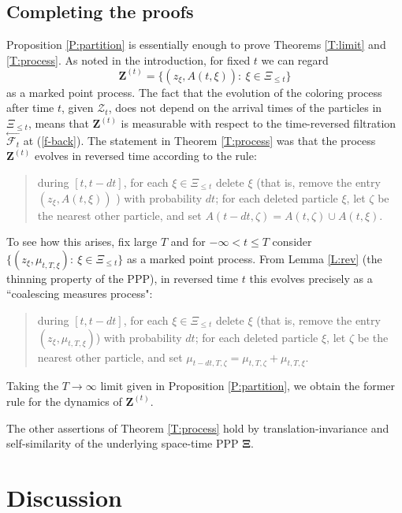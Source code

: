\documentclass[12pt]{article}
\newcommand{\FF}{\mbox{${\mathcal F}$}}
\newcommand{\ZZ}{\mbox{${\mathcal Z}$}}
\newcommand{\bZ}{\mathbf{Z}}
\begin{document}
\subsection{Completing the proofs}
Proposition \ref{P:partition} is essentially enough to prove Theorems \ref{T:limit} and \ref{T:process}.
As noted in the introduction, for fixed $t$ we can regard 
\[ \bZ^{(t)} = 
\{ (z_\xi, A(t,\xi)): \ \xi \in  \Xi_{\le t}  \}
\]
as a marked point process.
The fact that the evolution of the coloring process after time $t$, given $\ZZ_t$, does not depend on the arrival times of the particles in $\Xi_{\le t}$, 
means that $ \bZ^{(t)} $ is measurable with respect to the time-reversed filtration 
$\stackrel{\leftarrow} {\FF_{t}}$ at (\ref{f-back}).  
The statement in Theorem \ref{T:process} was that the process $ \bZ^{(t)} $
evolves in reversed time according to the rule:
\begin{quote}
during $[t, t - dt]$, for each $\xi \in \Xi_{\le t}$  delete $\xi$ 
(that is, remove the entry  $(z_\xi, A(t, \xi))$ )
 with probability $dt$; 
for each deleted particle $\xi$, let $\zeta$ be the nearest other particle,
and set  $A(t - dt, \zeta) = A(t, \zeta) \cup A(t,\xi)$.
\end{quote}
To see how this arises, fix large $T$ and for $- \infty < t \le T$ consider 
$\{ (z_\xi, \mu_{t,T,\xi}): \ \xi \in  \Xi_{\le t}  \}$ 
as a marked point process.  From  Lemma \ref{L:rev} (the thinning property of the PPP), in reversed time $t$ 
this evolves precisely as a ``coalescing measures process": 
\begin{quote}
during $[t, t - dt]$, for each $\xi \in \Xi_{\le t}$  delete $\xi$ 
(that is, remove the entry  $(z_\xi,  \mu_{t,T,\xi}) $)
 with probability $dt$; 
for each deleted particle $\xi$, let $\zeta$ be the nearest other particle,
and set  $ \mu_{t-dt,T,\zeta } =   \mu_{t,T,\zeta } +  \mu_{t,T,\xi }$.
\end{quote}
Taking the $T \to \infty$ limit given in Proposition \ref{P:partition}, we obtain the  former rule for the dynamics of $ \bZ^{(t)} $.
 
The other assertions of Theorem  \ref{T:process} hold by translation-invariance and  self-similarity of the 
underlying space-time PPP $\bm{\Xi}$.




\newpage
\section{Discussion}
\end{document}
